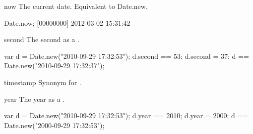 \begin{urbiscriptapi}
\item[now] The current date. Equivalent to Date.new.
\begin{urbiunchecked}
Date.now;
[00000000] 2012-03-02 15:31:42
\end{urbiunchecked}


\item[second]
  The second as a .
\begin{urbiassert}
var d = Date.new("2010-09-29 17:32:53");
d.second == 53;
d.second = 37;
d == Date.new("2010-09-29 17:32:37");
\end{urbiassert}


\item[timestamp] Synonym for .


\item[year]
  The year as a .
\begin{urbiassert}
var d = Date.new("2010-09-29 17:32:53");
d.year == 2010;
d.year = 2000;
d == Date.new("2000-09-29 17:32:53");
\end{urbiassert}
\end{urbiscriptapi}


